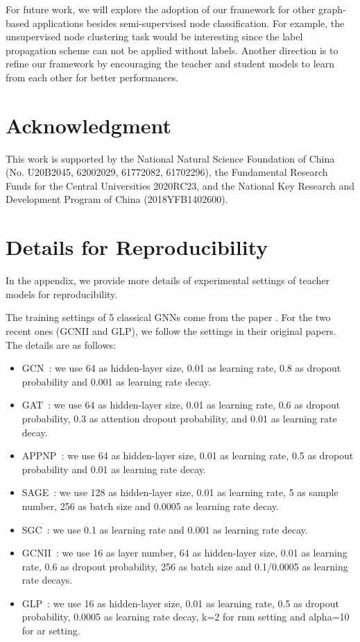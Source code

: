\documentclass[sigconf]{acmart}
\begin{document}
For future work, we will explore the adoption of our framework for other graph-based applications besides semi-supervised node classification. For example, the unsupervised node clustering task would be interesting since the label propagation scheme can not be applied without labels. Another direction is to refine our framework by encouraging the teacher and student models to learn from each other for better performances.

\section{Acknowledgment}
This work is supported by the National Natural Science Foundation of China (No. U20B2045, 62002029, 61772082, 61702296), the Fundamental Research Funds for the
Central Universities 2020RC23, and the National Key Research and Development Program of China (2018YFB1402600).



\newpage
\appendix
\section{Details for Reproducibility}
In the appendix, we provide more details of experimental settings of teacher models for reproducibility.

The training settings of 5 classical GNNs come from the paper \cite{shchur2018pitfalls}. For the two recent ones (GCNII and GLP), we follow the settings in their original papers. The details are as follows:
\begin{itemize}
    \item GCN~\cite{kipf2016semi}: we use 64 as hidden-layer size, 0.01 as learning rate, 0.8 as dropout probability and 0.001 as learning rate decay.
    \item GAT~\cite{velivckovic2018graph}: we use 64 as hidden-layer size, 0.01 as learning rate, 0.6 as dropout probability, 0.3 as attention dropout probability, and 0.01 as learning rate decay.
    \item APPNP~\cite{klicpera2018predict}: we use 64 as hidden-layer size, 0.01 as learning rate, 0.5 as dropout probability and 0.01 as learning rate decay.
    \item SAGE~\cite{hamilton2017inductive}: we use 128 as hidden-layer size, 0.01 as learning rate, 5 as sample number, 256 as batch size and 0.0005 as learning rate decay.
    \item SGC~\cite{wu2019simplifying}: we use 0.1 as learning rate and 0.001 as learning rate decay.
    \item GCNII~\cite{chen2020simple}: we use 16 as layer number, 64 as hidden-layer size, 0.01 as learning rate, 0.6 as dropout probability, 256 as batch size and 0.1/0.0005 as learning rate decays.
    \item GLP~\cite{li2019label}: we use 16 as hidden-layer size, 0.01 as learning rate, 0.5 as dropout probability, 0.0005 as learning rate decay, k=2 for rnm setting and alpha=10 for ar setting.
\end{itemize}
\end{document}
